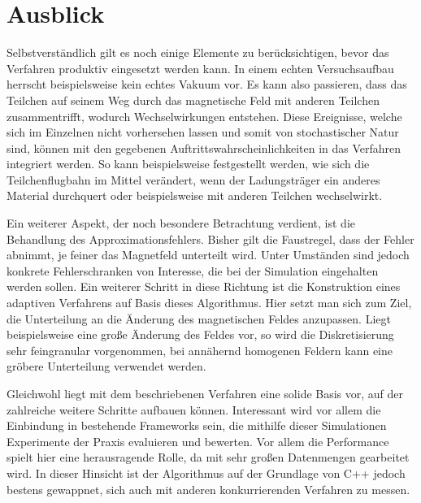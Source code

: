 \chapter{Ausblick}

Selbstverst\"andlich gilt es noch einige Elemente zu ber\"ucksichtigen, bevor das Verfahren produktiv eingesetzt werden kann.
In einem echten Versuchsaufbau herrscht beispielsweise kein echtes Vakuum vor. Es kann also passieren, dass das Teilchen auf seinem
Weg durch das magnetische Feld mit anderen Teilchen zusammentrifft, wodurch Wechselwirkungen entstehen. Diese Ereignisse, welche
sich im Einzelnen nicht vorhersehen lassen und somit von stochastischer Natur sind, k\"onnen mit den gegebenen Auftrittswahrscheinlichkeiten in das Verfahren integriert werden. So kann beispielsweise festgestellt werden, wie sich die Teilchenflugbahn im Mittel ver\"andert,
wenn der Ladungstr\"ager ein anderes Material durchquert oder beispielsweise mit anderen Teilchen wechselwirkt.

Ein weiterer Aspekt, der noch besondere Betrachtung verdient, ist die Behandlung des Approximationsfehlers. Bisher gilt die Faustregel, dass
der Fehler abnimmt, je feiner das Magnetfeld unterteilt wird. Unter Umst\"anden sind jedoch konkrete Fehlerschranken von Interesse, die bei der
Simulation eingehalten werden sollen. Ein weiterer Schritt in diese Richtung ist die Konstruktion eines adaptiven Verfahrens auf Basis dieses Algorithmus.
Hier setzt man sich zum Ziel, die Unterteilung an die \"Anderung des magnetischen Feldes anzupassen. Liegt beispielsweise eine gro{\ss}e \"Anderung des Feldes
vor, so wird die Diskretisierung sehr feingranular vorgenommen, bei ann\"ahernd homogenen Feldern kann eine gr\"obere Unterteilung verwendet werden.

Gleichwohl liegt mit dem beschriebenen Verfahren eine solide Basis vor, auf der zahlreiche weitere Schritte aufbauen k\"onnen. Interessant
wird vor allem die Einbindung in bestehende Frameworks sein, die mithilfe dieser Simulationen Experimente der Praxis evaluieren und bewerten.
Vor allem die Performance spielt hier eine herausragende Rolle, da mit sehr gro{\ss}en Datenmengen gearbeitet wird. In dieser Hinsicht ist der
Algorithmus auf der Grundlage von C++ jedoch bestens gewappnet, sich auch  mit anderen konkurrierenden Verfahren zu messen.
